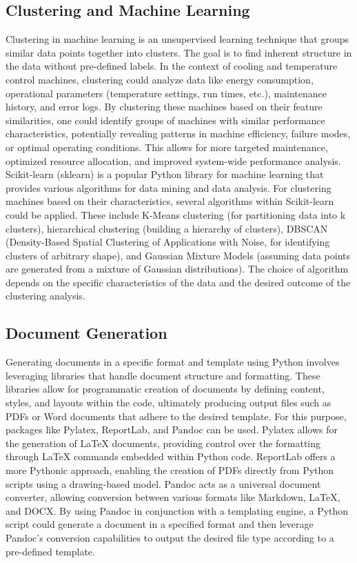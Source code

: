 \documentclass{article}%
\begin{document}
\subsection{Clustering and Machine Learning}%
\label{subsec:ClusteringandMachineLearning}%
Clustering in machine learning is an unsupervised learning technique that groups similar data points together into clusters.  The goal is to find inherent structure in the data without pre{-}defined labels.  In the context of cooling and temperature control machines, clustering could analyze data like energy consumption, operational parameters (temperature settings, run times, etc.), maintenance history, and error logs.  By clustering these machines based on their feature similarities, one could identify groups of machines with similar performance characteristics, potentially revealing patterns in machine efficiency, failure modes, or optimal operating conditions. This allows for more targeted maintenance, optimized resource allocation, and improved system{-}wide performance analysis.\newline%
Scikit{-}learn (sklearn) is a popular Python library for machine learning that provides various algorithms for data mining and data analysis.  For clustering machines based on their characteristics, several algorithms within Scikit{-}learn could be applied.  These include K{-}Means clustering (for partitioning data into k clusters), hierarchical clustering (building a hierarchy of clusters), DBSCAN (Density{-}Based Spatial Clustering of Applications with Noise, for identifying clusters of arbitrary shape), and Gaussian Mixture Models (assuming data points are generated from a mixture of Gaussian distributions).  The choice of algorithm depends on the specific characteristics of the data and the desired outcome of the clustering analysis.

%
\subsection{Document Generation}%
\label{subsec:DocumentGeneration}%
Generating documents in a specific format and template using Python involves leveraging libraries that handle document structure and formatting.  These libraries allow for programmatic creation of documents by defining content, styles, and layouts within the code, ultimately producing output files such as PDFs or Word documents that adhere to the desired template. For this purpose, packages like Pylatex, ReportLab, and Pandoc can be used.\newline%
Pylatex allows for the generation of LaTeX documents, providing control over the formatting through LaTeX commands embedded within Python code. ReportLab offers a more Pythonic approach, enabling the creation of PDFs directly from Python scripts using a drawing{-}based model.  Pandoc acts as a universal document converter, allowing conversion between various formats like Markdown, LaTeX, and DOCX.  By using Pandoc in conjunction with a templating engine, a Python script could generate a document in a specified format and then leverage Pandoc's conversion capabilities to output the desired file type according to a pre{-}defined template.
\end{document}
